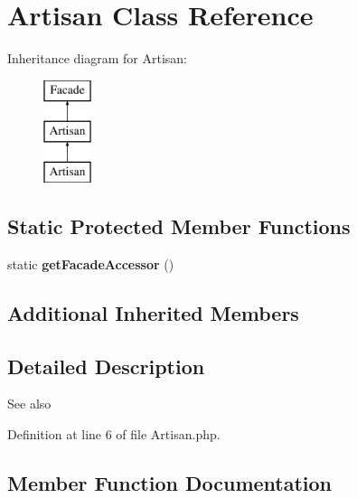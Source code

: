 \section{Artisan Class Reference}
\label{class_illuminate_1_1_support_1_1_facades_1_1_artisan}
Inheritance diagram for Artisan\+:\begin{figure}[H]
\begin{center}
\leavevmode
\includegraphics[height=3.000000cm]{class_illuminate_1_1_support_1_1_facades_1_1_artisan}
\end{center}
\end{figure}
\subsection*{Static Protected Member Functions}
\begin{DoxyCompactItemize}
\item 
static {\bf get\+Facade\+Accessor} ()
\end{DoxyCompactItemize}
\subsection*{Additional Inherited Members}


\subsection{Detailed Description}
\begin{DoxySeeAlso}{See also}

\end{DoxySeeAlso}


Definition at line 6 of file Artisan.\+php.



\subsection{Member Function Documentation}
